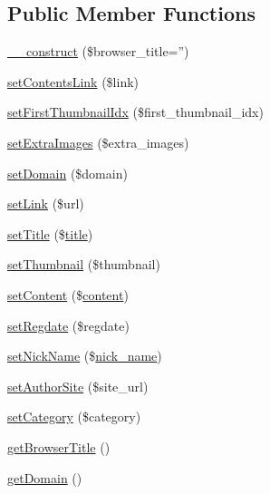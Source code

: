 \subsection*{Public Member Functions}
\begin{DoxyCompactItemize}
\item 
\hyperlink{classmcontentItem_ae80e66536f288a706ce7843ca006d21c}{\-\_\-\-\_\-construct} (\$browser\-\_\-title='')
\item 
\hyperlink{classmcontentItem_a8d8267fc8c63ad032d8dfa694b54d30b}{set\-Contents\-Link} (\$link)
\item 
\hyperlink{classmcontentItem_a97b29510d9386112296071cb06bd68dd}{set\-First\-Thumbnail\-Idx} (\$first\-\_\-thumbnail\-\_\-idx)
\item 
\hyperlink{classmcontentItem_a9907cf978c2b2dafbaeb307faea0874d}{set\-Extra\-Images} (\$extra\-\_\-images)
\item 
\hyperlink{classmcontentItem_adaf816a617e10b21c1b7cfa3080e4a25}{set\-Domain} (\$domain)
\item 
\hyperlink{classmcontentItem_a6c192aee58d7bca3d8933d387309b2ab}{set\-Link} (\$url)
\item 
\hyperlink{classmcontentItem_adb687bee610481753feb8bdd14fab049}{set\-Title} (\$\hyperlink{ko_8install_8php_a5b072c5fd1d2228c6ba5cee13cd142e3}{title})
\item 
\hyperlink{classmcontentItem_a956c763f26136b4e7a96ab07c04a1957}{set\-Thumbnail} (\$thumbnail)
\item 
\hyperlink{classmcontentItem_afb9763a013942bd40ab5a3b1c7491910}{set\-Content} (\$\hyperlink{classcontent}{content})
\item 
\hyperlink{classmcontentItem_aeb646f2283bfb0a13b7d9f544058f962}{set\-Regdate} (\$regdate)
\item 
\hyperlink{classmcontentItem_a4b702963538643aac56d9a3312a06bee}{set\-Nick\-Name} (\$\hyperlink{ko_8install_8php_a151ecae87a1f3d7e257aa089803086bd}{nick\-\_\-name})
\item 
\hyperlink{classmcontentItem_adaa9ad60dd8f5373b9f2258a6effe70c}{set\-Author\-Site} (\$site\-\_\-url)
\item 
\hyperlink{classmcontentItem_a004c63ef8da549d29d201b4946372c5e}{set\-Category} (\$category)
\item 
\hyperlink{classmcontentItem_a6fe964acc2f33039f90a6ed33ae03ba9}{get\-Browser\-Title} ()
\item 
\hyperlink{classmcontentItem_a29a4fb4f4bedd748ec93238be37a22fb}{get\-Domain} ()
\item 

\end{DoxyCompactItemize}
